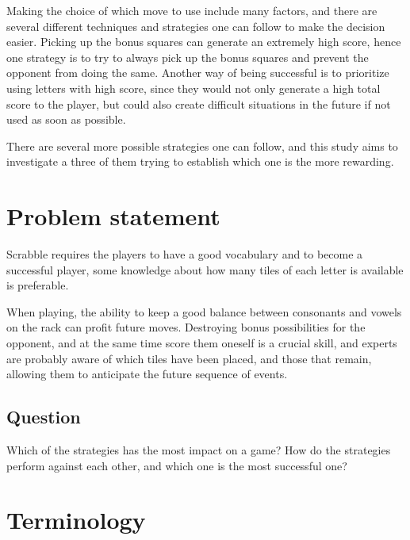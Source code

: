 \documentclass[a4paper, 12pt]{report}
\begin{document}
Making the choice of which move to use include many factors, and there are several different techniques and strategies one can follow to make the decision easier. Picking up the bonus squares can generate an extremely high score, hence one strategy is to try to always pick up the bonus squares and prevent the opponent from doing the same. Another way of being successful is to prioritize using letters with high score, since they would not only generate a high total score to the player, but could also create difficult situations in the future if not used as soon as possible.

There are several more possible strategies one can follow, and this study aims to investigate a three of them trying to establish which one is the more rewarding.

\section{Problem statement}
Scrabble requires the players to have a good vocabulary and to become a successful player, some knowledge about how many tiles of each letter is available is preferable. 

When playing, the ability to keep a good balance between consonants and vowels on the rack can profit future moves. Destroying bonus possibilities for the opponent, and at the same time score them oneself is a crucial skill, and experts are probably aware of which tiles have been placed, and those that remain, allowing them to anticipate the future sequence of events. 

\subsection{Question}
Which of the strategies has the most impact on a game? How do the strategies perform against each other, and which one is the most successful one? 


\section {Terminology}
\label{sec:terminology}
\end{document}
